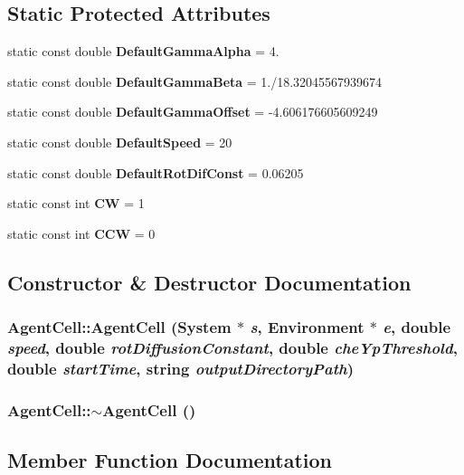 \subsection*{Static Protected Attributes}
\begin{CompactItemize}
\item 
static const double {\bf DefaultGammaAlpha} = 4.
\item 
static const double {\bf DefaultGammaBeta} = 1./18.32045567939674
\item 
static const double {\bf DefaultGammaOffset} = -4.606176605609249
\item 
static const double {\bf DefaultSpeed} = 20
\item 
static const double {\bf DefaultRotDifConst} = 0.06205
\item 
static const int {\bf CW} = 1
\item 
static const int {\bf CCW} = 0
\end{CompactItemize}


\subsection{Constructor \& Destructor Documentation}
\subsubsection{\setlength{\rightskip}{0pt plus 5cm}AgentCell::AgentCell ({\bf System} $\ast$ {\em s}, {\bf Environment} $\ast$ {\em e}, double {\em speed}, double {\em rotDiffusionConstant}, double {\em cheYpThreshold}, double {\em startTime}, string {\em outputDirectoryPath})}\label{classAgentCell_e544a84cb45bef5f0b2e781ed1f0cbbd}


\subsubsection{\setlength{\rightskip}{0pt plus 5cm}AgentCell::$\sim$AgentCell ()}\label{classAgentCell_508e3b1efb3d1f98dbe3442fe7beb0a7}




\subsection{Member Function Documentation}
